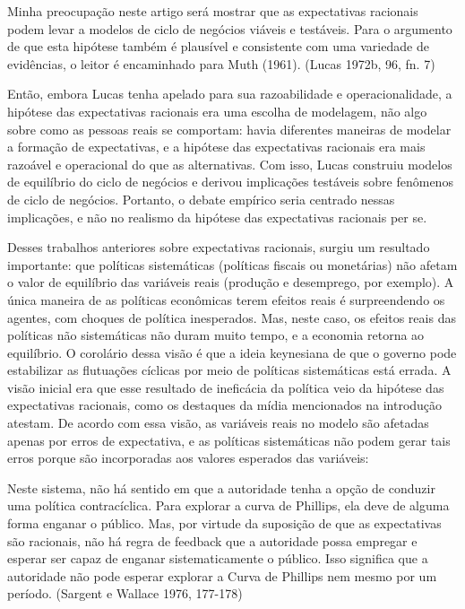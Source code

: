 \documentclass[a4paper,12pt]{article}[abntex2]
\begin{document}
Minha preocupação neste artigo será mostrar que as expectativas racionais podem levar a modelos de ciclo de negócios viáveis e testáveis. Para o argumento de que esta hipótese também é plausível e consistente com uma variedade de evidências, o leitor é encaminhado para Muth (1961). (Lucas 1972b, 96, fn. 7)

Então, embora Lucas tenha apelado para sua razoabilidade e operacionalidade, a hipótese das expectativas racionais era uma escolha de modelagem, não algo sobre como as pessoas reais se comportam: havia diferentes maneiras de modelar a formação de expectativas, e a hipótese das expectativas racionais era mais razoável e operacional do que as alternativas. Com isso, Lucas construiu modelos de equilíbrio do ciclo de negócios e derivou implicações testáveis sobre fenômenos de ciclo de negócios. Portanto, o debate empírico seria centrado nessas implicações, e não no realismo da hipótese das expectativas racionais per se.

Desses trabalhos anteriores sobre expectativas racionais, surgiu um resultado importante: que políticas sistemáticas (políticas fiscais ou monetárias) não afetam o valor de equilíbrio das variáveis reais (produção e desemprego, por exemplo). A única maneira de as políticas econômicas terem efeitos reais é surpreendendo os agentes, com choques de política inesperados. Mas, neste caso, os efeitos reais das políticas não sistemáticas não duram muito tempo, e a economia retorna ao equilíbrio. O corolário dessa visão é que a ideia keynesiana de que o governo pode estabilizar as flutuações cíclicas por meio de políticas sistemáticas está errada. A visão inicial era que esse resultado de ineficácia da política veio da hipótese das expectativas racionais, como os destaques da mídia mencionados na introdução atestam. De acordo com essa visão, as variáveis reais no modelo são afetadas apenas por erros de expectativa, e as políticas sistemáticas não podem gerar tais erros porque são incorporadas aos valores esperados das variáveis:

Neste sistema, não há sentido em que a autoridade tenha a opção de conduzir uma política contracíclica. Para explorar a curva de Phillips, ela deve de alguma forma enganar o público. Mas, por virtude da suposição de que as expectativas são racionais, não há regra de feedback que a autoridade possa empregar e esperar ser capaz de enganar sistematicamente o público. Isso significa que a autoridade não pode esperar explorar a Curva de Phillips nem mesmo por um período. (Sargent e Wallace 1976, 177-178)
\end{document}
